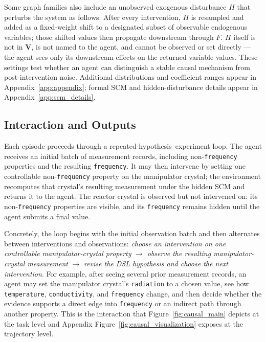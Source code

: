 Some graph families also include an unobserved exogenous disturbance \(H\)
that perturbs the system as follows. After every intervention, \(H\) is
resampled and added as a fixed-weight shift to a designated subset of
observable endogenous variables; those shifted values then propagate
downstream through \(F\). \(H\) itself is not in \(\mathbf{V}\), is not named
to the agent, and cannot be observed or set directly --- the agent sees only
its downstream effects on the returned variable values. These settings test
whether an agent can distinguish a stable causal mechanism from
post-intervention noise. Additional distributions and coefficient ranges
appear in Appendix~\ref{app:appendix}; formal SCM and hidden-disturbance
details appear in Appendix~\ref{app:scm_details}.
\subsection{Interaction and Outputs}
\label{sec:obs-int}

Each episode proceeds through a repeated hypothesis--experiment loop. The
agent receives an initial batch of measurement records, including
non-\texttt{frequency} properties and the resulting \texttt{frequency}. It may
then intervene by setting one controllable non-\texttt{frequency} property on
the manipulator crystal; the environment recomputes that crystal's resulting
measurement under the hidden SCM and returns it to the agent. The reactor
crystal is observed but not intervened on: its non-\texttt{frequency}
properties are visible, and its
\texttt{frequency} remains hidden until the agent submits a final value.

Concretely, the loop begins with the initial observation batch and then
alternates between interventions and observations:
\emph{choose an intervention on one controllable manipulator-crystal property}
\(\rightarrow\) \emph{observe the resulting manipulator-crystal measurement}
\(\rightarrow\) \emph{revise the DSL hypothesis and choose the next
intervention}. For example, after seeing several prior measurement records, an
agent may set the manipulator crystal's \texttt{radiation} to a
chosen value, see how \texttt{temperature}, \texttt{conductivity}, and
\texttt{frequency} change, and then decide whether the evidence supports a
direct edge into \texttt{frequency} or an indirect path through another
property. This is the interaction that Figure~\ref{fig:causal_main} depicts at
the task level and Appendix Figure~\ref{fig:causal_visualization} exposes at the
trajectory level.

